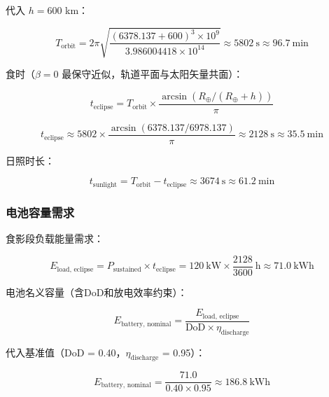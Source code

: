 代入 $h = 600$ km：

\begin{equation}
  T_{\text{orbit}} = 2\pi\sqrt{\frac{(6378.137 + 600)^{3} \times 10^{9}}{3.986004418 \times 10^{14}}}
                     \approx 5802\ \text{s} \approx 96.7\ \text{min}
\end{equation}

食时（$\beta = 0$ 最保守近似，轨道平面与太阳矢量共面）：

\begin{equation}
  t_{\text{eclipse}} = T_{\text{orbit}} \times \frac{\arcsin(R_{\oplus} / (R_{\oplus} + h))}{\pi}
  \label{eq:eclipse-time}
\end{equation}

\begin{equation}
  t_{\text{eclipse}} \approx 5802 \times \frac{\arcsin(6378.137 / 6978.137)}{\pi}
                     \approx 2128\ \text{s} \approx 35.5\ \text{min}
\end{equation}

日照时长：

\begin{equation}
  t_{\text{sunlight}} = T_{\text{orbit}} - t_{\text{eclipse}} \approx 3674\ \text{s} \approx 61.2\ \text{min}
  \label{eq:sunlight-time}
\end{equation}

\subsubsection{电池容量需求}

食影段负载能量需求：

\begin{equation}
  E_{\text{load, eclipse}} = P_{\text{sustained}} \times t_{\text{eclipse}}
                            = 120\ \text{kW} \times \frac{2128}{3600}\ \text{h}
                            \approx 71.0\ \text{kWh}
  \label{eq:eload}
\end{equation}

电池名义容量（含DoD和放电效率约束）：

\begin{equation}
  E_{\text{battery, nominal}} = \frac{E_{\text{load, eclipse}}}{\text{DoD} \times \eta_{\text{discharge}}}
  \label{eq:battery-capacity}
\end{equation}

代入基准值（DoD = 0.40，$\eta_{\text{discharge}}$ = 0.95）：

\begin{equation}
  E_{\text{battery, nominal}} = \frac{71.0}{0.40 \times 0.95} \approx 186.8\ \text{kWh}
\end{equation}

